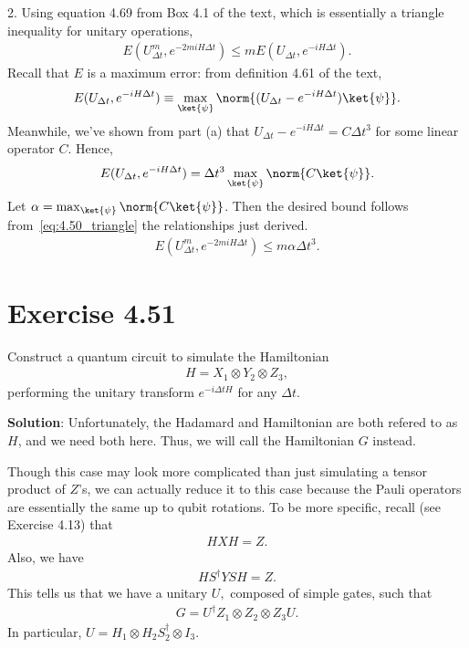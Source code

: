 \documentclass{book}
\begin{document}
    2. Using equation 4.69 from Box 4.1 of the text, which is essentially a triangle inequality for unitary operations,
    \begin{align} \label{eq:4.50_triangle}
        E(U_{\Delta t}^m, e^{-2miH\Delta t}) \leq m E(U_{\Delta t}, e^{-i H \Delta t}).
    \end{align}
    Recall that $E$ is a maximum error: from definition 4.61 of the text,
    \begin{align}
        E(U_{\Delta t}, e^{-i H \Delta t}) \equiv \max_{\ket{\psi}} \norm{(U_{\Delta t} -e^{-i H \Delta t})\ket{\psi}}.
    \end{align}
    Meanwhile, we've shown from part (a) that $U_{\Delta t} -e^{-i H \Delta t} = C \Delta t^3$ for some linear operator $C$. Hence,
    \begin{align}
        E(U_{\Delta t}, e^{-i H \Delta t}) = \Delta t^3 \max_{\ket{\psi}} \norm{C \ket{\psi}}.
    \end{align}
    Let $\alpha = \max_{\ket{\psi}} \norm{C \ket{\psi}}$. Then the desired bound follows from~\eqref{eq:4.50_triangle} the relationships just derived.
    \begin{align}
        E(U_{\Delta t}^m, e^{-2miH\Delta t}) \leq m \alpha \Delta t^3.
    \end{align}

\section*{Exercise 4.51}
    Construct a quantum circuit to simulate the Hamiltonian
    \begin{align}
        H = X_1 \otimes Y_2 \otimes Z_3,
    \end{align}
    performing the unitary transform $e^{-i\Delta t H}$ for any $\Delta t$.

    \textbf{Solution}: Unfortunately, the Hadamard and Hamiltonian are both refered to as $H$, and we need both here. Thus, we will call the Hamiltonian $G$ instead.
    
    Though this case may look more complicated than just simulating a tensor product of $Z$'s, we can actually reduce it to this case because the Pauli operators are essentially the same up to qubit rotations. To be more specific, recall (see Exercise 4.13) that
    \begin{align}
        HXH = Z.
    \end{align}
    Also, we have
    \begin{align}
        H S^\dagger Y S H = Z.
    \end{align}
    This tells us that we have a unitary $U,$ composed of simple gates, such that
    \begin{align}
        G = U^\dagger Z_1\otimes Z_2 \otimes Z_3 U.
    \end{align}
    In particular, $U = H_1 \otimes H_2 S_2^\dagger \otimes I_3$. 
\end{document}
